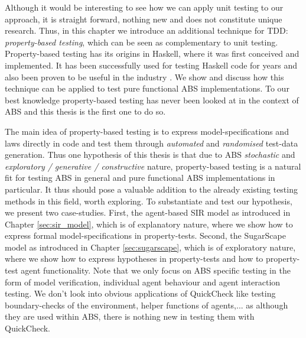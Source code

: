\medskip

Although it would be interesting to see how we can apply unit testing to our approach, it is straight forward, nothing new and does not constitute unique research. Thus, in this chapter we introduce an additional technique for TDD: \textit{property-based testing}, which can be seen as complementary to unit testing. Property-based testing has its origins \cite{claessen_quickcheck_2000,claessen_testing_2002,runciman_smallcheck_2008} in Haskell, where it was first conceived and implemented. It has been successfully used for testing Haskell code for years and also been proven to be useful in the industry \cite{hughes_quickcheck_2007}. We show and discuss how this technique can be applied to test pure functional ABS implementations. To our best knowledge property-based testing has never been looked at in the context of ABS and this thesis is the first one to do so.

\medskip

The main idea of property-based testing is to express model-specifications and laws directly in code and test them through \textit{automated} and \textit{randomised} test-data generation. Thus one hypothesis of this thesis is that due to ABS \textit{stochastic} and \textit{exploratory / generative / constructive } nature, property-based testing is a natural fit for testing ABS in general and pure functional ABS implementations in particular. It thus should pose a valuable addition to the already existing testing methods in this field, worth exploring. To substantiate and test our hypothesis, we present two case-studies. First, the agent-based SIR model as introduced in Chapter \ref{sec:sir_model}, which is of explanatory nature, where we show how to express formal model-specifications in property-tests. Second, the SugarScape model as introduced in Chapter \ref{sec:sugarscape}, which is of exploratory nature, where we show how to express hypotheses in property-tests and how to property-test agent functionality. Note that we only focus on ABS specific testing in the form of model verification, individual agent behaviour and agent interaction testing. We don't look into obvious applications of QuickCheck like testing boundary-checks of the environment, helper functions of agents,... as although they are used within ABS, there is nothing new in testing them with QuickCheck.

